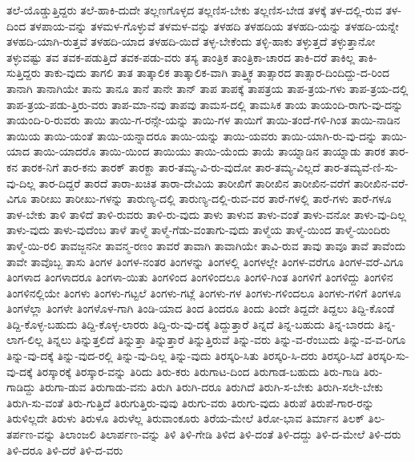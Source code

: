 {ತಲೆ-ಯೊಡ್ಡುತ್ತಿದ್ದರು
ತಲೆ-ಹಾಕಿ-ದುದೇ
ತಲ್ಲಣಗೊಳ್ಳದ
ತಲ್ಲಣಿಸ-ಬೇಕು
ತಲ್ಲಣಿಸ-ಬೇಡ
ತಳಕ್ಕೆ
ತಳ-ದಲ್ಲಿ-ರುವ
ತಳ-ದಿಂದ
ತಳಪಾಯ-ವನ್ನು
ತಳಮಳ-ಗೊಳ್ಳುವೆ
ತಳಮಳ-ವನ್ನು
ತಳಹದಿ
ತಳಹದಿಯ
ತಳಹದಿ-ಯನ್ನು
ತಳಹದಿ-ಯನ್ನೇ
ತಳಹದಿ-ಯಾಗಿ-ರುತ್ತವೆ
ತಳಹದಿ-ಯಾದ
ತಳಹದಿ-ಯಿದೆ
ತಳ್ಳ-ಬೇಕೆಂದು
ತಳ್ಳಿ-ಹಾಕು
ತಳ್ಳುತ್ತದೆ
ತಳ್ಳುತ್ತಾನೋ
ತಳ್ಳುವಷ್ಟು
ತವ
ತವಕ-ಪಡುತ್ತಿದೆ
ತವಕ-ಪಡು-ವರು
ತಸ್ಯ
ತಾಂತ್ರಿಕ
ತಾಂತ್ರಿಕಾ-ಚಾರದ
ತಾಕಿ-ದರೆ
ತಾಕಿಲ್ಲ
ತಾಕಿ-ಸುತ್ತಿದ್ದರು
ತಾಕು-ವುದು
ತಾಗಲಿ
ತಾತ
ತಾತ್ಕಾಲಿಕ
ತಾತ್ಕಾಲಿಕ-ವಾಗಿ
ತಾತ್ತ್ವಿಕ
ತಾತ್ಸಾರದ
ತಾತ್ಸಾರ-ದಿಂದಿದ್ದು-ದ-ರಿಂದ
ತಾನಾಗಿ
ತಾನಾಗಿಯೇ
ತಾನು
ತಾನೂ
ತಾನೆ
ತಾನೇ
ತಾನ್
ತಾಪ
ತಾಪಕ್ಕೆ
ತಾಪತ್ರಯ
ತಾಪ-ತ್ರಯ-ಗಳು
ತಾಪ-ತ್ರಯ-ದಲ್ಲಿ
ತಾಪ-ತ್ರಯ-ಪಡು-ತ್ತಿರು-ವರು
ತಾಪ-ಮಾ-ನವು
ತಾಪವು
ತಾಮಸ-ದಲ್ಲಿ
ತಾಮಸಿಕ
ತಾಯ
ತಾಯಂದಿ-ರಾಗು-ವು-ದನ್ನು
ತಾಯಂದಿ-ರಿ-ರುವರು
ತಾಯಿ
ತಾಯಿ-ಗ-ರನ್ಸೇ-ಯನ್ನು
ತಾಯಿ-ಗಳ
ತಾಯಿಗೆ
ತಾಯಿ-ತಂದೆ-ಗಳಿ-ಗಿಂತ
ತಾಯಿ-ನಾಡಿನ
ತಾಯಿಯ
ತಾಯಿ-ಯಂತೆ
ತಾಯಿ-ಯನ್ನಾದರೂ
ತಾಯಿ-ಯನ್ನು
ತಾಯಿ-ಯವರು
ತಾಯಿ-ಯಾಗಿ-ರು-ವು-ದನ್ನು
ತಾಯಿ-ಯಾದ
ತಾಯಿ-ಯಾದರೊ
ತಾಯಿ-ಯಿಂದ
ತಾಯಿಯು
ತಾಯಿ-ಯೆಂದು
ತಾಯೆ
ತಾಯ್ನಾಡಿನ
ತಾಯ್ನಾಡು
ತಾರಕ
ತಾರ-ಕನ
ತಾರಕ-ನಿಗೆ
ತಾರ-ಕನು
ತಾರಕ್
ತಾರಕ್ದಾ
ತಾರ-ತಮ್ಯ-ವಿ-ರು-ವುದೋ
ತಾರ-ತಮ್ಯ-ವಿಲ್ಲದೆ
ತಾರ-ತಮ್ಯವೆ-ಣಿ-ಸು-ವು-ದಿಲ್ಲ
ತಾರ-ದಿದ್ದರೆ
ತಾರದೆ
ತಾರಾ-ಖಚಿತ
ತಾರಾ-ದೇವಿಯ
ತಾರೀಖಿಗೆ
ತಾರೀಖಿನ
ತಾರೀಖಿನ-ವರೆಗೆ
ತಾರೀಖಿನ-ವರೆ-ವಿಗೂ
ತಾರೀಖು
ತಾರೀಖು-ಗಳನ್ನು
ತಾರುಣ್ಯ-ದಲ್ಲಿ
ತಾರುಣ್ಯ-ದಲ್ಲಿ-ರುವ-ವರ
ತಾರೆ-ಗಳಲ್ಲಿ
ತಾರೆ-ಗಳು
ತಾರೆ-ಗಳೂ
ತಾಳ-ಬೇಕು
ತಾಳಿ
ತಾಳಿದೆ
ತಾಳಿ-ರುವರು
ತಾಳಿ-ರು-ವುದು
ತಾಳು
ತಾಳುವ
ತಾಳು-ವಂತೆ
ತಾಳು-ವನೋ
ತಾಳು-ವು-ದಿಲ್ಲ
ತಾಳು-ವುದು
ತಾಳು-ವುದೆಂಬ
ತಾಳೆ
ತಾಳ್ಮೆ
ತಾಳ್ಮೆ-ಗೆಡು-ವಂತಾಗು-ವುದು
ತಾಳ್ಮೆಯ
ತಾಳ್ಮೆ-ಯಿಂದ
ತಾಳ್ಮೆ-ಯಿಂದಿರು
ತಾಳ್ಮೆ-ಯಿ-ರಲಿ
ತಾವಜ್ಜನನೀ
ತಾವನ್ಮ-ರಣಂ
ತಾವರೆ
ತಾವಾಗಿ
ತಾವಾಗಿಯೇ
ತಾವಿ-ರುವ
ತಾವು
ತಾವೂ
ತಾವೆ
ತಾವೆಂದು
ತಾವೇ
ತಾವೊಬ್ಬ
ತಾಸು
ತಿಂಗಳ
ತಿಂಗಳ-ನಂತರ
ತಿಂಗಳನ್ನು
ತಿಂಗಳಲ್ಲಿ
ತಿಂಗಳಲ್ಲೇ
ತಿಂಗಳ-ವರೆಗೂ
ತಿಂಗಳ-ವರೆ-ವಿಗೂ
ತಿಂಗಳಾದ
ತಿಂಗಳಾದರೂ
ತಿಂಗಳಾ-ಯಿತು
ತಿಂಗಳಿಂದ
ತಿಂಗಳಿಂದಲೂ
ತಿಂಗಳಿ-ಗಿಂತ
ತಿಂಗಳಿಗೆ
ತಿಂಗಳಿದ್ದು
ತಿಂಗಳಿನ
ತಿಂಗಳಿನಲ್ಲಿಯೇ
ತಿಂಗಳು
ತಿಂಗಳು-ಗಟ್ಟಲೆ
ತಿಂಗಳು-ಗಟ್ಲೆ
ತಿಂಗಳು-ಗಳ
ತಿಂಗಳು-ಗಳಿಂದಲೂ
ತಿಂಗಳು-ಗಳಿಗೆ
ತಿಂಗಳೂ
ತಿಂಗಳೆಲ್ಲಾ
ತಿಂಗಳೇ
ತಿಂಗಳೊಳ-ಗಾಗಿ
ತಿಂಡಿ-ಯಾದ
ತಿಂದ
ತಿಂದರೂ
ತಿಂದು
ತಿಂದೇ
ತಿದ್ದದೇ
ತಿದ್ದಲು
ತಿದ್ದಿ-ಕೊಂಡೆ
ತಿದ್ದಿ-ಕೊಳ್ಳ-ಬಹುದು
ತಿದ್ದಿ-ಕೊಳ್ಳ-ಲಾರರು
ತಿದ್ದಿ-ರು-ವು-ದಕ್ಕೆ
ತಿದ್ದುತ್ತಾರೆ
ತಿನ್ನದೆ
ತಿನ್ನ-ಬಹುದು
ತಿನ್ನ-ಬಾರದು
ತಿನ್ನ-ಲಾಗ-ಲಿಲ್ಲ
ತಿನ್ನಲು
ತಿನ್ನುತ್ತಲಿದೆ
ತಿನ್ನುತ್ತಾ
ತಿನ್ನುತ್ತಾರೆ
ತಿನ್ನುತ್ತಿರುವೆ
ತಿನ್ನು-ವರು
ತಿನ್ನು-ವ-ರೆಂಬುದು
ತಿನ್ನು-ವ-ವ-ರಿಗೂ
ತಿನ್ನು-ವು-ದಕ್ಕೆ
ತಿನ್ನು-ವುದ-ರಲ್ಲಿ
ತಿನ್ನು-ವು-ದಿಲ್ಲ
ತಿನ್ನು-ವುದು
ತಿರಸ್ಕರಿ-ಸಿತು
ತಿರಸ್ಕರಿ-ಸಿ-ದರು
ತಿರಸ್ಕರಿ-ಸಿದೆ
ತಿರಸ್ಕರಿ-ಸು-ವು-ದಕ್ಕೆ
ತಿರಸ್ಕಾರಕ್ಕೆ
ತಿರಸ್ಕಾರ-ವನ್ನು
ತಿರಿದು
ತಿರು-ಕರು
ತಿರುಗಾಟ-ದಿಂದ
ತಿರುಗಾಡ-ಬಹುದು
ತಿರು-ಗಾಡಿ
ತಿರು-ಗಾಡಿದ್ದು
ತಿರುಗಾ-ಡುವ
ತಿರುಗಾಡು-ವನು
ತಿರುಗಿ
ತಿರುಗಿ-ದರೂ
ತಿರುಗಿದೆ
ತಿರುಗಿ-ಸ-ಬೇಕು
ತಿರುಗಿ-ಸಲೇ-ಬೇಕು
ತಿರುಗಿ-ಸು-ವಂತೆ
ತಿರು-ಗುತ್ತಿದೆ
ತಿರುಗುತ್ತಿರು-ವುವು
ತಿರುಗು-ವರು
ತಿರುಗು-ವುದು
ತಿರುಪೆ
ತಿರುಪೆ-ಗಾರ-ರನ್ನು
ತಿರುಳಿಲ್ಲದೇ
ತಿರುಳು
ತಿರುಳೂ
ತಿರುಳೆಲ್ಲ
ತಿರುವಾಂಕೂರು
ತಿರೆಯ-ಮೇಲೆ
ತಿರೋ-ಭಾವ
ತಿರ್ಮಾನ
ತಿಲಕ್
ತಿಲ-ತರ್ಪಣ-ವನ್ನು
ತಿಲಾಂಜಲಿ
ತಿಲಾರ್ಪಣ-ವನ್ನು
ತಿಳಿ
ತಿಳಿ-ಗೇಡಿ
ತಿಳಿದ
ತಿಳಿ-ದಂತೆ
ತಿಳಿ-ದದ್ದು
ತಿಳಿ-ದ-ಮೇಲೆ
ತಿಳಿ-ದರು
ತಿಳಿ-ದರೂ
ತಿಳಿ-ದರೆ
ತಿಳಿ-ದ-ವರು
}
